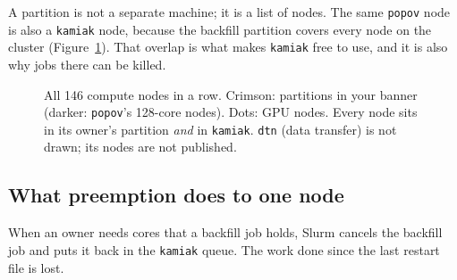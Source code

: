 \documentclass[10pt,letterpaper]{article}
\begin{document}
A partition is not a separate machine; it is a list of nodes. The same \texttt{popov} node is also a \texttt{kamiak} node, because the backfill partition covers every node on the cluster (Figure~\ref{fig:strip}). That overlap is what makes \texttt{kamiak} free to use, and it is also why jobs there can be killed.

\begin{figure}[H]
\centering

\caption{All 146 compute nodes in a row. Crimson: partitions in your banner (darker: \texttt{popov}'s 128-core nodes). Dots: GPU nodes. Every node sits in its owner's partition \emph{and} in \texttt{kamiak}. \texttt{dtn} (data transfer) is not drawn; its nodes are not published.}
\label{fig:strip}
\end{figure}

\subsection{What preemption does to one node}

When an owner needs cores that a backfill job holds, Slurm cancels the backfill job and puts it back in the \texttt{kamiak} queue. The work done since the last restart file is lost.
\end{document}
